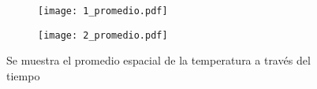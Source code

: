 \documentclass[a4paper]{article}
\begin{document}
	\begin{figure}
		\centering
		\begin{subfigure}{\textwidth}
			\centering
			\texttt{[image: 1\_promedio.pdf]}
			\caption{\label{fig:1_promedio}}
		\end{subfigure}
		\begin{subfigure}{\textwidth}
			\centering
			\texttt{[image: 2\_promedio.pdf]}
			\caption{\label{fig:2_promedio}}
			\end{subfigure}
		\caption{\label{fig:Tvst} Se muestra el promedio espacial de la temperatura a trav\'es del tiempo}
	\end{figure}
\end{document}
